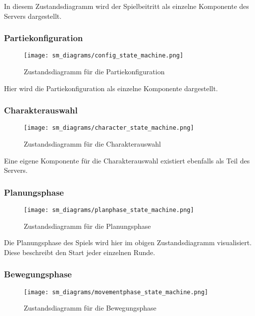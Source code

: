 \documentclass{uulm-assignment}
\begin{document}
    In diesem Zustandsdiagramm wird der Spielbeitritt als einzelne Komponente des Servers dargestellt.
    
    \subsubsection{Partiekonfiguration}
        \begin{figure}[ht]
            \centering
            \texttt{[image: sm\_diagrams/config\_state\_machine.png]}
            \caption{Zustandsdiagramm für die Partiekonfiguration}
            \label{config-sm-diagram}
        \end{figure}

        Hier wird die Partiekonfiguration als einzelne Komponente dargestellt.
    
    \newpage

    \subsubsection{Charakterauswahl}
        \begin{figure}[ht]
            \centering
            \texttt{[image: sm\_diagrams/character\_state\_machine.png]}
            \caption{Zustandsdiagramm für die Charakterauswahl}
            \label{character-sm-diagram}
        \end{figure}

        Eine eigene Komponente für die Charakterauswahl existiert ebenfalls als Teil des Servers.

    \subsubsection{Planungsphase}
        \begin{figure}[ht]
            \centering
            \texttt{[image: sm\_diagrams/planphase\_state\_machine.png]}
            \caption{Zustandsdiagramm für die Planungsphase}
            \label{planphase-sm-diagram}
        \end{figure}

        Die Planungsphase des Spiels wird hier im obigen Zustandsdiagramm visualisiert. 
        Diese beschreibt den Start jeder einzelnen Runde.

    \newpage
    \subsubsection{Bewegungsphase}
        \begin{figure}[ht]
            \centering
            \texttt{[image: sm\_diagrams/movementphase\_state\_machine.png]}
            \caption{Zustandsdiagramm für die Bewegungsphase}
            \label{movementphase-sm-diagram}
        \end{figure}
\end{document}
